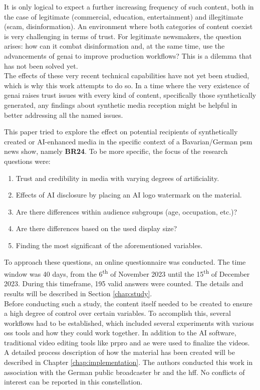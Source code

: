\documentclass[
  a4paper,  %
  twoside,  %
  bibliography=totoc,
  headsepline,
  cleardoublepage=empty,
  parskip=half,
  draft=false
]{scrbook}
\begin{document}
It is only logical to expect a further increasing frequency of such content, both in the case of legitimate (commercial, education, entertainment) and illegitimate (scam, disinformation). An environment where both categories of content coexist is very challenging in terms of trust. For legitimate newsmakers, the question arises: how can it combat disinformation and, at the same time, use the advancements of \gls{genai} to improve production workflows? This is a dilemma that has not been solved yet. \\
The effects of these very recent technical capabilities have not yet been studied, which is why this work attempts to do so. In a time where the very existence of \gls{genai} raises trust issues with every kind of content, specifically those synthetically generated, any findings about synthetic media reception might be helpful in better addressing all the named issues.

This paper tried to explore the effect on potential recipients of synthetically created or AI-enhanced media in the specific context of a Bavarian/German \gls{psm} news show, namely \textbf{BR24}. To be more specific, the focus of the research questions were: 

\begin{enumerate}
  \item Trust and credibility in media with varying degrees of artificiality.
  \item Effects of AI disclosure by placing an AI logo watermark on the material.
  \item Are there differences within audience subgroups (age, occupation, etc.)?
  \item Are there differences based on the used display size?
  \item Finding the most significant of the aforementioned variables.
\end{enumerate}

To approach these questions, an online questionnaire was conducted. The time window was 40 days, from the 6\textsuperscript{th} of November 2023 until the 15\textsuperscript{th} of December 2023. During this timeframe, 195 valid answers were counted. The details and results will be described in Section \ref{chap:study}. \\
Before conducting such a study, the content itself needed to be created to ensure a high degree of control over certain variables. To accomplish this, several workflows had to be established, which included several experiments with various \gls{oss} tools and how they could work together. In addition to the AI software, traditional video editing tools like \gls{prpro} and \gls{ae} were used to finalize the videos. A detailed process description of how the material has been created will be described in Chapter \ref{chap:implementation}. The authors conducted this work in association with the German public broadcaster \gls{br} and the \gls{hff}. No conflicts of interest can be reported in this constellation.
\end{document}
